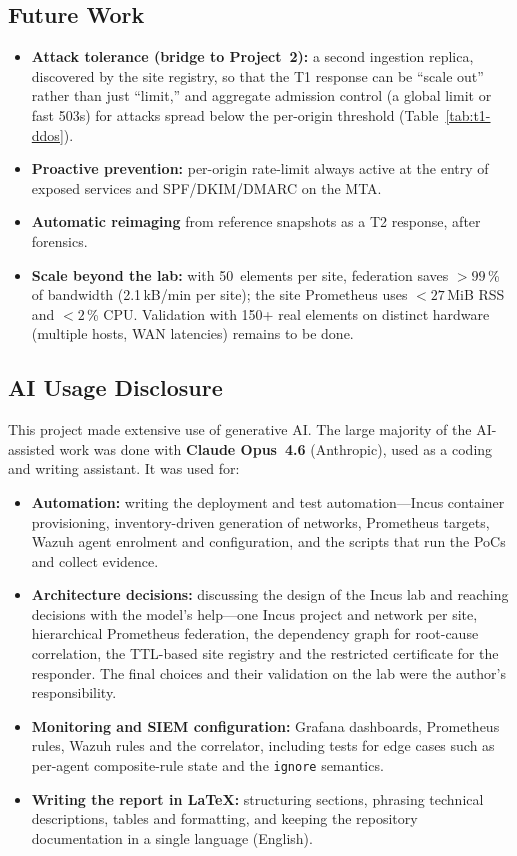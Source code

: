 \documentclass[11pt,a4paper]{article}
\begin{document}
\subsection{Future Work}

\begin{itemize}
  \item \textbf{Attack tolerance (bridge to Project~2):} a second ingestion replica,
    discovered by the site registry, so that the T1 response can be ``scale out'' rather than
    just ``limit,'' and aggregate admission control (a global limit or fast 503s) for attacks
    spread below the per-origin threshold (Table~\ref{tab:t1-ddos}).
  \item \textbf{Proactive prevention:} per-origin rate-limit always active at the entry of
    exposed services and SPF/DKIM/DMARC on the MTA.
  \item \textbf{Automatic reimaging} from reference snapshots as a T2 response, after
    forensics.
  \item \textbf{Scale beyond the lab:} with 50~elements per site, federation saves
    $> 99$\,\% of bandwidth (2.1\,kB/min per site); the site Prometheus uses $< 27$\,MiB RSS
    and $< 2$\,\% CPU. Validation with 150+ real elements on distinct hardware (multiple
    hosts, WAN latencies) remains to be done.
\end{itemize}


\subsection{AI Usage Disclosure}

This project made extensive use of generative AI. The large majority of the AI-assisted work
was done with \textbf{Claude Opus~4.6} (Anthropic), used as a coding and writing assistant.
It was used for:

\begin{itemize}
  \item \textbf{Automation:} writing the deployment and test automation---Incus container
    provisioning, inventory-driven generation of networks, Prometheus targets, Wazuh agent
    enrolment and configuration, and the scripts that run the PoCs and collect evidence.
  \item \textbf{Architecture decisions:} discussing the design of the Incus lab and reaching
    decisions with the model's help---one Incus project and network per site, hierarchical
    Prometheus federation, the dependency graph for root-cause correlation, the TTL-based site
    registry and the restricted certificate for the responder. The final choices and their
    validation on the lab were the author's responsibility.
  \item \textbf{Monitoring and SIEM configuration:} Grafana dashboards, Prometheus rules, Wazuh
    rules and the correlator, including tests for edge cases such as per-agent composite-rule
    state and the \texttt{ignore} semantics.
  \item \textbf{Writing the report in \LaTeX:} structuring sections, phrasing technical
    descriptions, tables and formatting, and keeping the repository documentation in a single
    language (English).
\end{itemize}
\end{document}
